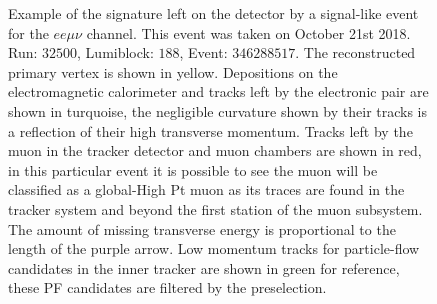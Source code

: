 \begin{figure}
  \centering
  \vfil
  \caption{Example of the signature left on the detector by a signal-like event
    for the $ee\mu\nu$ channel. This event was taken on October 21st 2018. Run: $32500$,
    Lumiblock: $188$, Event: $346288517$. The reconstructed primary vertex is shown in yellow.
    Depositions on the electromagnetic calorimeter
    and tracks left by the electronic pair are shown in turquoise, the negligible curvature
    shown by their tracks is a reflection of their high transverse momentum. Tracks left by the muon
    in the tracker detector and muon chambers are shown in red, in this particular event it
    is possible to see the muon will be classified as a global-High Pt muon as its traces
    are found in the tracker system and beyond the first station of the muon subsystem.
    The amount of missing
    transverse energy is proportional to the length of the purple arrow. Low momentum
    tracks for particle-flow candidates in the inner tracker are shown in green for
    reference, these PF candidates are filtered by the preselection. }
  \label{fig:Fireworks_eemuv}
\end{figure}

